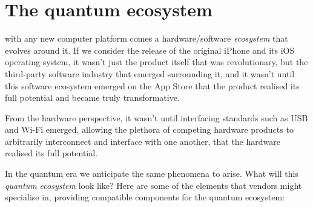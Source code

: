 %
%

\section{The quantum ecosystem}

\newline

 with any new computer platform comes a hardware/software \textit{ecosystem} that evolves around it. If we consider the release of the original iPhone and its iOS operating system, it wasn't just the product itself that was revolutionary, but the third-party software industry that emerged surrounding it, and it wasn't until this software ecosystem emerged on the App Store that the product realised its full potential and became truly transformative.

From the hardware perspective, it wasn't until interfacing standards such as USB and Wi-Fi emerged, allowing the plethora of competing hardware products to arbitrarily interconnect and interface with one another, that the hardware realised its full potential.

In the quantum era we anticipate the same phenomena to arise. What will this \textit{quantum ecosystem} look like? Here are some of the elements that vendors might specialise in, providing compatible components for the quantum ecosystem:

